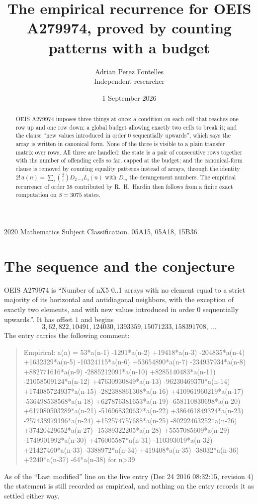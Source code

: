 \documentclass[11pt,a4paper]{article}
\title{The empirical recurrence for OEIS A279974, proved by counting patterns with a budget}
\author{Adrian Perez Fontelles\\ \small Independent researcher}
\date{1 September 2026}
\theoremstyle{plain}
\theoremstyle{definition}
\begin{document}
\maketitle

\begin{abstract}
OEIS A279974 imposes three things at once: a condition on each cell that reaches one row up and
one row down; a global budget allowing exactly two cells to
break it; and the clause ``new values introduced in order $0$ sequentially upwards'', which
says the array is written in canonical form. None of the three is visible to a plain transfer
matrix over rows. All three are handled: the state is a pair of consecutive rows
together with the number of offending cells so far, capped at the budget; and the
canonical-form clause is removed by counting equality patterns instead of arrays, through the
identity $2!\,a(n)=\sum_i\binom{2}{i}D_{2-i}L_i(n)$ with $D_m$ the derangement
numbers. The empirical recurrence of order $38$ contributed by R.~H.~Hardin then follows
from a finite exact computation on $S=3075$ states.
\end{abstract}

\noindent\small 2020 Mathematics Subject Classification. 05A15, 05A18, 15B36.\normalsize

\section{The sequence and the conjecture}

OEIS A279974 is ``Number of nX5 0..1 arrays with no element equal to a strict majority of its horizontal and antidiagonal neighbors, with the exception of exactly two elements, and with new values introduced in order 0 sequentially upwards.''. It has offset $1$ and begins
\[
3, 62, 822, 10491, 124030, 1393359, 15071233, 158391708,\ \dots
\]
The entry carries the following comment:
\begin{quote}\small
Empirical: a(n) = 53*a(n-1) -1291*a(n-2) +19418*a(n-3) -204835*a(n-4) +1632329*a(n-5) -10324115*a(n-6) +53654890*a(n-7) -234937934*a(n-8) +882771616*a(n-9) -2885212091*a(n-10) +8285140483*a(n-11) -21058509124*a(n-12) +47630930849*a(n-13) -96230469370*a(n-14) +174085724937*a(n-15) -282388861308*a(n-16) +410961960219*a(n-17) -536498538568*a(n-18) +627876381653*a(n-19) -658110830698*a(n-20) +617080503289*a(n-21) -516968320637*a(n-22) +386461849324*a(n-23) -257438979196*a(n-24) +152574757688*a(n-25) -80292463252*a(n-26) +37420429652*a(n-27) -15389322205*a(n-28) +5557085609*a(n-29) -1749901992*a(n-30) +476005587*a(n-31) -110393019*a(n-32) +21427460*a(n-33) -3388972*a(n-34) +419408*a(n-35) -38032*a(n-36) +2240*a(n-37) -64*a(n-38) for n>39
\end{quote}
As of the ``Last modified'' line on the live entry (Dec 24 2016 08:32:15, revision 4) the statement is
still recorded as empirical, and nothing on the entry records it as settled either way.
\end{document}
